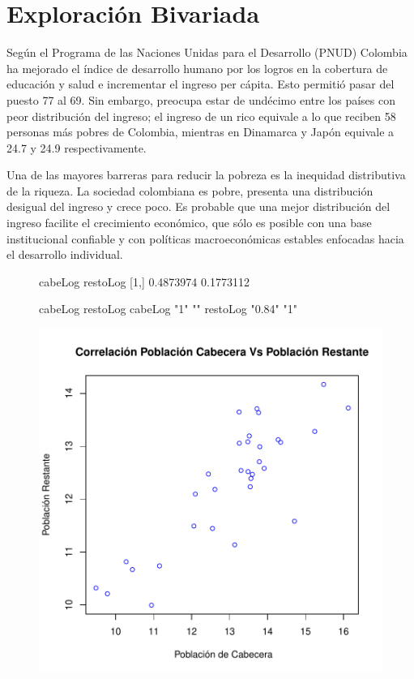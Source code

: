 \section{Exploración Bivariada}\label{bivariada}


Según el Programa de las Naciones Unidas para el Desarrollo (PNUD) Colombia ha mejorado el índice de desarrollo humano por los logros en la cobertura de educación y salud e incrementar el ingreso per cápita. Esto permitió pasar del puesto 77 al 69. Sin embargo, preocupa estar de undécimo entre los países con peor distribución del ingreso; el ingreso de un rico equivale a lo que reciben 58 personas más pobres de Colombia, mientras en Dinamarca y Japón equivale a 24.7 y 24.9 respectivamente.

Una de las mayores barreras para reducir la pobreza es la inequidad distributiva de la riqueza. La sociedad colombiana es pobre, presenta una distribución desigual del ingreso y crece poco. Es probable que una mejor distribución del ingreso facilite el crecimiento económico, que sólo es posible con una base institucional confiable y con políticas macroeconómicas estables enfocadas hacia el desarrollo individual.


\begin{figure}[h]
\begin{Schunk}
\begin{Soutput}
       cabeLog  restoLog
[1,] 0.4873974 0.1773112
\end{Soutput}
\begin{Soutput}
         cabeLog restoLog
cabeLog  "1"     ""      
restoLog "0.84"  "1"     
\end{Soutput}
\end{Schunk}
\includegraphics{bivariada-correl}
\end{figure}

\endinput
